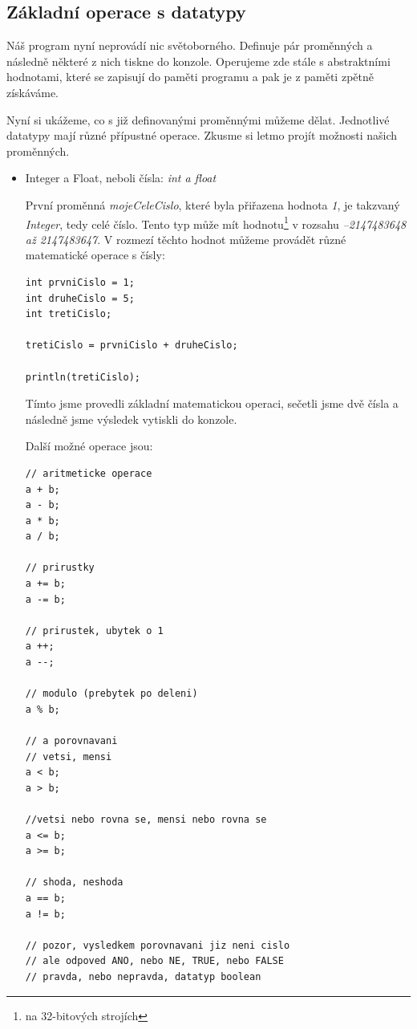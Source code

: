 \documentclass[10pt]{book}
\newcommand{\pododdil}[1]{\subsection{#1}\index{#1}\label{#1}}
\begin{document}
\pododdil{Základní operace s datatypy}

Náš program nyní neprovádí nic světoborného. Definuje pár proměnných a následně některé z nich tiskne do konzole. Operujeme zde stále s abstraktními hodnotami, které se zapisují do paměti programu a pak je z paměti zpětně získáváme.

Nyní si ukážeme, co s již definovanými proměnnými můžeme dělat. Jednotlivé datatypy mají různé přípustné operace. Zkusme si letmo projít možnosti našich proměnných.

\begin{itemize}


\item{Integer a Float, neboli čísla: {\em int a float}}

První proměnná {\em mojeCeleCislo}, které byla přiřazena hodnota {\em 1}, je takzvaný {\em Integer}, tedy celé číslo. Tento typ může mít hodnotu\footnote{na 32-bitových strojích} v rozsahu {\em –2147483648 až 2147483647}. V rozmezí těchto hodnot můžeme provádět různé matematické operace s čísly:

\begin{lstlisting}
int prvniCislo = 1;
int druheCislo = 5;
int tretiCislo;

tretiCislo = prvniCislo + druheCislo;

println(tretiCislo);
\end{lstlisting}

Tímto jsme provedli základní matematickou operaci, sečetli jsme dvě čísla a následně jsme výsledek vytiskli do konzole.

Další možné operace jsou:

\begin{lstlisting}
// aritmeticke operace
a + b;
a - b;
a * b;
a / b;

// prirustky
a += b;
a -= b;

// prirustek, ubytek o 1
a ++;
a --;

// modulo (prebytek po deleni)
a % b;

// a porovnavani
// vetsi, mensi
a < b;
a > b;

//vetsi nebo rovna se, mensi nebo rovna se
a <= b;
a >= b;

// shoda, neshoda
a == b;
a != b;

// pozor, vysledkem porovnavani jiz neni cislo
// ale odpoved ANO, nebo NE, TRUE, nebo FALSE
// pravda, nebo nepravda, datatyp boolean

\end{lstlisting}


\end{itemize}
\end{document}
